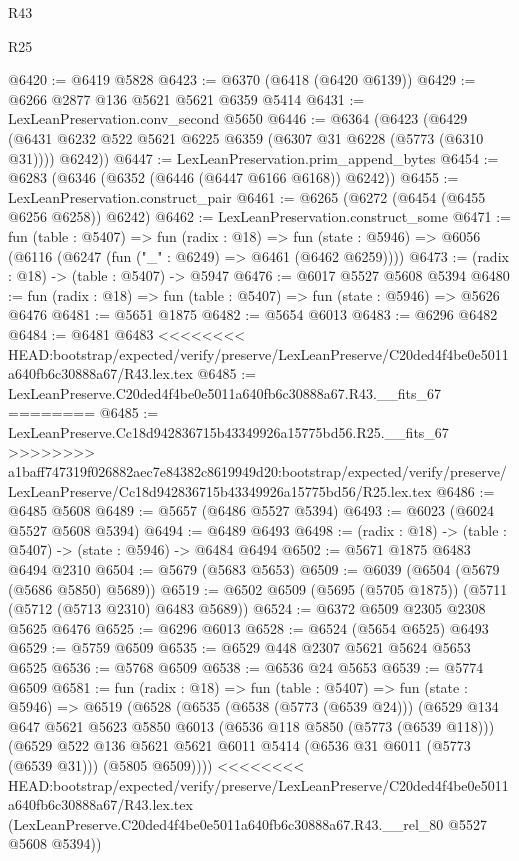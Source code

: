 \begin{lexlean}{R43}
\begin{lexlean}{R25}
\begin{coremodule}
{{{{{{{{{{{{{{{{{{{{{{{{{{{{{{{{{{{{{{{{{{{{{{{{{{{{{{{{{{{{{{{{{{{{{{{{{{{{{{{{{{{{{{{{{{{{{{{{{{{{{{{{{{{{{{{{{{{{{{{{{{{{{{{{{{{{{{{{{{{{{{{{{{{{{{{{{{{{{{{{{{{{{{{{{{{{{{{{{{{{{{{{{{{{{{{{{@6420 := @6419 @5828
@6423 := @6370 (@6418 (@6420 @6139))
@6429 := @6266 @2877 @136 @5621 @5621 @6359 @5414
@6431 := LexLeanPreservation.conv_second @5650
@6446 := @6364
    (@6423 (@6429 (@6431 @6232 @522 @5621 @6225 @6359 (@6307 @31 @6228 (@5773 (@6310 @31)))) @6242))
@6447 := LexLeanPreservation.prim_append_bytes
@6454 := @6283 (@6346 (@6352 (@6446 (@6447 @6166 @6168)) @6242))
@6455 := LexLeanPreservation.construct_pair
@6461 := @6265 (@6272 (@6454 (@6455 @6256 @6258)) @6242)
@6462 := LexLeanPreservation.construct_some
@6471 := fun (table : @5407) =>
  fun (radix : @18) =>
  fun (state : @5946) => @6056 (@6116 (@6247 (fun ("_" : @6249) => @6461 (@6462 @6259))))
@6473 := (radix : @18) -> (table : @5407) -> @5947
@6476 := @6017 @5527 @5608 @5394
@6480 := fun (radix : @18) => fun (table : @5407) => fun (state : @5946) => @5626 @6476
@6481 := @5651 @1875
@6482 := @5654 @6013
@6483 := @6296 @6482
@6484 := @6481 @6483
<<<<<<<< HEAD:bootstrap/expected/verify/preserve/LexLeanPreserve/C20ded4f4be0e5011a640fb6c30888a67/R43.lex.tex
@6485 := LexLeanPreserve.C20ded4f4be0e5011a640fb6c30888a67.R43.__fits_67
========
@6485 := LexLeanPreserve.Cc18d942836715b43349926a15775bd56.R25.__fits_67
>>>>>>>> a1baff747319f026882aec7e84382c8619949d20:bootstrap/expected/verify/preserve/LexLeanPreserve/Cc18d942836715b43349926a15775bd56/R25.lex.tex
@6486 := @6485 @5608
@6489 := @5657 (@6486 @5527 @5394)
@6493 := @6023 (@6024 @5527 @5608 @5394)
@6494 := @6489 @6493
@6498 := (radix : @18) -> (table : @5407) -> (state : @5946) -> @6484 @6494
@6502 := @5671 @1875 @6483 @6494 @2310
@6504 := @5679 (@5683 @5653)
@6509 := @6039 (@6504 (@5679 (@5686 @5850) @5689))
@6519 := @6502 @6509 (@5695 (@5705 @1875)) (@5711 (@5712 (@5713 @2310) @6483 @5689))
@6524 := @6372 @6509 @2305 @2308 @5625 @6476
@6525 := @6296 @6013
@6528 := @6524 (@5654 @6525) @6493
@6529 := @5759 @6509
@6535 := @6529 @448 @2307 @5621 @5624 @5653 @6525
@6536 := @5768 @6509
@6538 := @6536 @24 @5653
@6539 := @5774 @6509
@6581 := fun (radix : @18) =>
  fun (table : @5407) =>
  fun (state : @5946) =>
  @6519
    (@6528
      (@6535
        (@6538 (@5773 (@6539 @24)))
        (@6529
          @134
          @647
          @5621
          @5623
          @5850
          @6013
          (@6536 @118 @5850 (@5773 (@6539 @118)))
          (@6529
            @522
            @136
            @5621
            @5621
            @6011
            @5414
            (@6536 @31 @6011 (@5773 (@6539 @31)))
            (@5805 @6509))))
<<<<<<<< HEAD:bootstrap/expected/verify/preserve/LexLeanPreserve/C20ded4f4be0e5011a640fb6c30888a67/R43.lex.tex
      (LexLeanPreserve.C20ded4f4be0e5011a640fb6c30888a67.R43.__rel_80 @5527 @5608 @5394))
}}}}}}}}}}}}}}}}}}}}}}}}}}}}}}}}}}}}}}}}}}}}}}}}}}}}}}}}}}}}}}}}}}}}}}}}}}}}}}}}}}}}}}}}}}}}}}}}}}}}}}}}}}}}}}}}}}}}}}}}}}}}}}}}}}}}}}}}}}}}}}}}}}}}}}}}}}}}}}}}}}}}}}}}}}}}}}}}}}}}}}}}}}}}}}}}}
\end{coremodule}
\end{lexlean}
\end{lexlean}
